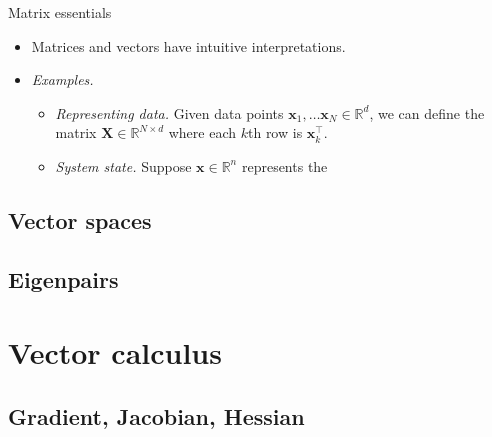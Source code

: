 \documentclass{beamer}
\numberwithin{equation}{section}
\begin{document}
\begin{frame}{Matrix essentials}
    \begin{itemize}
        \item
        Matrices and vectors have intuitive interpretations.

        \item
        \textit{Examples.}
        \begin{itemize}
            \item
            \textit{Representing data.} Given data points $ \mathbf{x}_1,
            \ldots \mathbf{x}_N \in \mathbb{R}^d $, we can define the matrix
            $ \mathbf{X} \in \mathbb{R}^{N \times d} $ where each $ k $th row
            is $ \mathbf{x}_k^\top $.

            \item
            \textit{System state.} Suppose $ \mathbf{x} \in \mathbb{R}^n $
            represents the
        \end{itemize}
    \end{itemize}
\end{frame}

\subsection{Vector spaces}

\subsection{Eigenpairs}

\section{Vector calculus}

\subsection{Gradient, Jacobian, Hessian}
\end{document}
